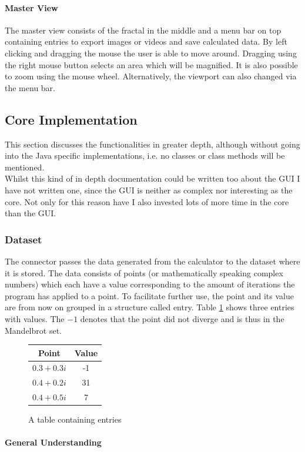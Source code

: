 \documentclass[12pt,a4paper,titlepage]{article}
\begin{document}
	\paragraph{Master View}
	The master view consists of the fractal in the middle and a menu bar on top containing entries to export images or videos and save calculated data. By left clicking and dragging the mouse the user is able to move around. Dragging using the right mouse button selects an area which will be magnified. It is also possible to zoom using the mouse wheel. Alternatively, the viewport can also changed via the menu bar.
	\subsection{Core Implementation}\label{sec:implementation}
	This section discusses the functionalities in greater depth, although without going into the Java specific implementations, i.e. no classes or class methods will be mentioned.\\
	Whilst this kind of in depth documentation could be written too about the GUI I have not written one, since the GUI is neither as complex nor interesting as the core. Not only for this reason have I also invested lots of more time in the core than the GUI.
	\subsubsection{Dataset}
	The connector passes the data generated from the calculator to the dataset where it is stored. The data consists of points (or mathematically speaking complex numbers) which each have a value corresponding to the amount of iterations the program has applied to a point. To facilitate further use, the point and its value are from now on grouped in a structure called entry. Table \ref{fig:entries} shows three entries with values. The \(-1\) denotes that the point did not diverge and is thus in the Mandelbrot set.
	\begin{figure}
		\centering
		\caption{A table containing entries}
		\label{fig:entries}
		\begin{tabular}{c|c}
			Point        & Value \\ \hline
			\(0.3+0.3i\) & -1    \\ \hline
			\(0.4+0.2i\) & 31    \\ \hline
			\(0.4+0.5i\) & 7     \\
		\end{tabular}
	\end{figure}
	\paragraph{General Understanding}
	
\end{document}
